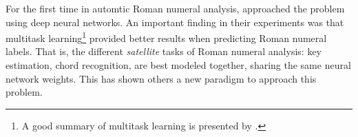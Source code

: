

For the first time in automtic Roman numeral analysis,
\textcite{chen2018functional} approached the problem using
deep neural networks. An important finding in their
experiments was that multitask learning\footnote{A good
summary of multitask learning is presented by
\textcite{ruder2017overview}.} provided better results when
predicting Roman numeral labels. That is, the different
\emph{satellite} tasks of Roman numeral analysis: key
estimation, chord recognition, are best modeled together,
sharing the same neural network weights. This has shown
others a new paradigm to approach this problem.
